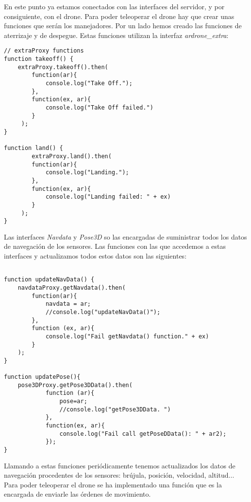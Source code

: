 En este punto ya estamos conectados con las interfaces del servidor, y por consiguiente, con el drone. Para poder teleoperar el drone hay que crear unas funciones que serán los manejadores. Por un lado hemos creado las funciones de aterrizaje y de despegue. Estas funciones utilizan la interfaz \emph{ardrone\_extra}:\\

\begin{lstlisting}[caption=Funciones aterrizaje y despegue.]
// extraProxy functions  
function takeoff() {
    extraProxy.takeoff().then(
        function(ar){
            console.log("Take Off.");
        },
        function(ex, ar){
            console.log("Take Off failed.")
        }
     );
}
    
function land() {
        extraProxy.land().then(
        function(ar){
            console.log("Landing.");
        },
        function(ex, ar){
            console.log("Landing failed: " + ex)
        }
     );
}
\end{lstlisting}

Las interfaces \emph{Navdata} y \emph{Pose3D} so las encargadas de suministrar todos los datos de navegación de los sensores. Las funciones con las que accedemos a estas interfaces y actualizamos todos estos datos son las siguientes:\\

\begin{lstlisting}[caption=Variables actualización datos de los sensores.]

function updateNavData() {
    navdataProxy.getNavdata().then(
        function(ar){
            navdata = ar;
            //console.log("updateNavData()");
        },
        function (ex, ar){
            console.log("Fail getNavdata() function." + ex)
        }        
    );    
}

function updatePose(){
    pose3DProxy.getPose3DData().then(
            function (ar){
                pose=ar;
                //console.log("getPose3DData. ")
            },
            function(ex, ar){
                console.log("Fail call getPoseDData(): " + ar2);
            });   
}

\end{lstlisting}


Llamando a estas funciones periódicamente tenemos actualizados los datos de navegación procedentes de los sensores: brújula, posición, velocidad, altitud...\\

Para poder teleoperar el drone se ha implementado una función que es la encargada de enviarle las órdenes de movimiento.\\

